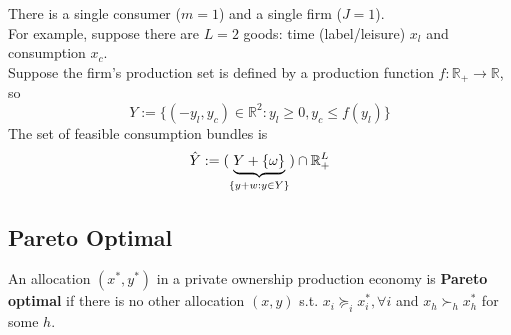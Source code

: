 \documentclass[11pt]{elegantbook}
\begin{document}
\begin{example}
    There is a single consumer ($m=1$) and a single firm ($J=1$).\\
    For example, suppose there are $L=2$ goods: time (label/leisure) $x_l$ and consumption $x_c$.\\
    Suppose the firm's production set is defined by a production function $f: \mathbb{R}_+ \rightarrow \mathbb{R}$, so $$Y:=\{(-y_l,y_c)\in \mathbb{R}^2:y_l\geq 0,y_c\leq f(y_l)\}$$
    The set of feasible consumption bundles is
    \begin{equation}
        \begin{aligned}
            \Hat{Y}:=(\underbrace{Y+\{\omega\}}_{\{y+w:y\in Y\}})\cap \mathbb{R}_+^L
        \end{aligned}
        \nonumber
    \end{equation}
\end{example}

\subsection{Pareto Optimal}
\begin{definition}
    \normalfont
    An allocation $(x^*,y^*)$ in a private ownership production economy is \textbf{Pareto optimal} if there is no other allocation $(x,y)$ s.t. $x_i\succeq_i x_i^*, \forall i$ and $x_h\succ_h x_h^*$ for some $h$.
\end{definition}
\end{document}

